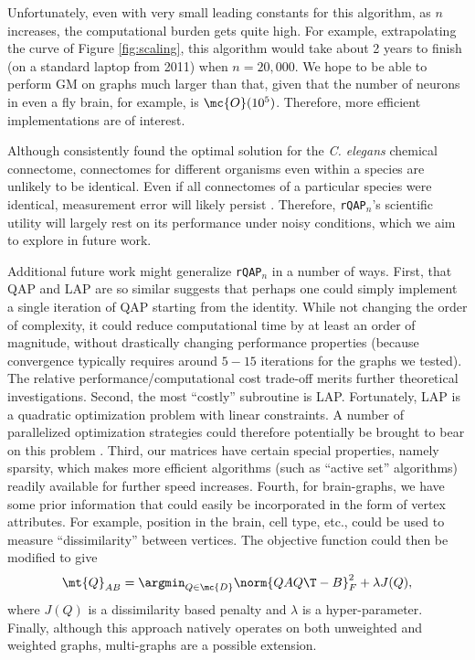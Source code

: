 \documentclass[10pt,journal,cspaper,compsoc]{IEEEtran}
\begin{document}
Unfortunately, even with very small leading constants for this algorithm, as $n$ increases, the computational burden gets quite high.  For example, extrapolating the curve of Figure \ref{fig:scaling}, this algorithm would take about 2 years to finish (on a standard laptop from 2011) when $n=20,000$.  We hope to be able to perform GM on graphs much larger than that, given that the number of neurons in even a fly brain, for example, is $\mc{O}(10^5)$.  Therefore, more efficient implementations are of interest.  

Although \rqapn consistently found the optimal solution for the \emph{C. elegans} chemical connectome, connectomes for different organisms even within a species are unlikely to be identical. Even if all connectomes of a particular species were identical, measurement error will likely persist \cite{Helmstaedter2011}. Therefore, \texttt{rQAP}$_n$'s scientific utility will largely rest on its performance under noisy conditions, which we aim to explore in future work.  

Additional future work might generalize \texttt{rQAP}$_n$ in a number of ways.  First, that QAP and LAP are so similar suggests that perhaps one could simply implement a single iteration of QAP starting from the identity.  While not changing the order of complexity, it could reduce computational time by at least an order of magnitude, without drastically changing performance properties (because convergence typically requires around $5-15$ iterations for the graphs we tested).  The relative performance/computational cost trade-off merits further theoretical investigations.  Second, the most ``costly'' subroutine is LAP.  Fortunately, LAP is a quadratic optimization problem with linear constraints.  A number of parallelized optimization strategies could therefore potentially be brought to bear on this problem \cite{Boyd2011}.  Third, our matrices have certain special properties, namely sparsity, which makes more efficient algorithms (such as ``active set'' algorithms) readily available for further speed increases.  Fourth, for brain-graphs, we have some prior information that could easily be incorporated in the form of vertex attributes.  For example, position in the brain, cell type, etc., could be used to measure ``dissimilarity'' between vertices.  The objective function could then be modified to give
\begin{align} \label{eq:Jqap}
	\mt{Q}_{AB}= \argmin_{Q \in \mc{D}} \norm{Q A Q\T - B}^2_F + \lambda J(Q),
\end{align}
where $J(Q)$ is a dissimilarity based penalty and $\lambda$ is a hyper-parameter.  Finally, although this approach natively operates on both unweighted and weighted graphs, multi-graphs are a possible extension.
\end{document}
